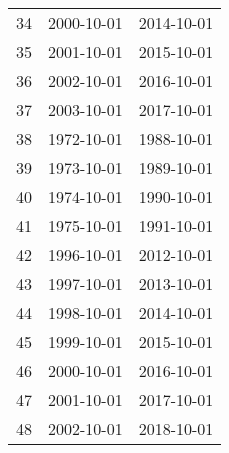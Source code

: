\begin{tabular}{ccc}
  34 & 2000-10-01 & 2014-10-01 \\ 
  35 & 2001-10-01 & 2015-10-01 \\ 
  36 & 2002-10-01 & 2016-10-01 \\ 
  37 & 2003-10-01 & 2017-10-01 \\ 
  38 & 1972-10-01 & 1988-10-01 \\ 
  39 & 1973-10-01 & 1989-10-01 \\ 
  40 & 1974-10-01 & 1990-10-01 \\ 
  41 & 1975-10-01 & 1991-10-01 \\ 
  42 & 1996-10-01 & 2012-10-01 \\ 
  43 & 1997-10-01 & 2013-10-01 \\ 
  44 & 1998-10-01 & 2014-10-01 \\ 
  45 & 1999-10-01 & 2015-10-01 \\ 
  46 & 2000-10-01 & 2016-10-01 \\ 
  47 & 2001-10-01 & 2017-10-01 \\ 
  48 & 2002-10-01 & 2018-10-01 \\ 
   \hline
\end{tabular}
